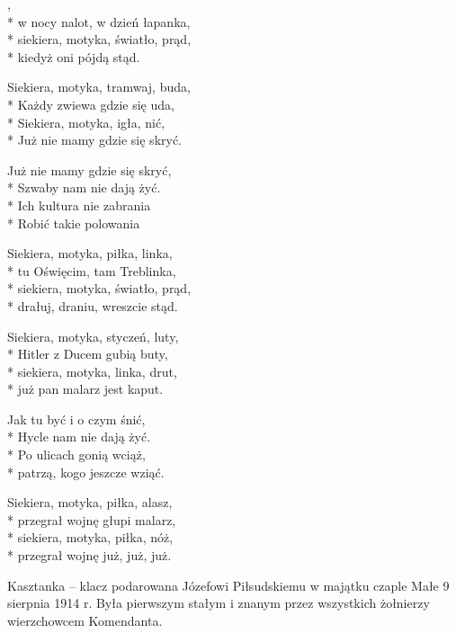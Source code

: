 \begin{lyrics}[longestline={Siekiera, motyka, bimber, szklanka,}]

,\\*
w nocy nalot, w dzień łapanka,\\*
siekiera, motyka, światło, prąd,\\*
kiedyż oni pójdą stąd.

Siekiera, motyka, tramwaj, buda,\\*
Każdy zwiewa gdzie się uda,\\*
Siekiera, motyka, igła, nić,\\*
Już nie mamy gdzie się skryć.

Już nie mamy gdzie się skryć,\\*
Szwaby nam nie dają żyć.\\*
Ich kultura nie zabrania\\*
Robić takie polowania

Siekiera, motyka, piłka, linka,\\*
tu Oświęcim, tam Treblinka,\\*
siekiera, motyka, światło, prąd,\\*
drałuj, draniu, wreszcie stąd.

Siekiera, motyka, styczeń, luty,\\*
Hitler z Ducem gubią buty,\\*
siekiera, motyka, linka, drut,\\*
już pan malarz jest kaput.

Jak tu być i o czym śnić,\\*
Hycle nam nie dają żyć.\\*
Po ulicach gonią wciąż,\\*
patrzą, kogo jeszcze wziąć.

Siekiera, motyka, piłka, alasz,\\*
przegrał wojnę głupi malarz,\\*
siekiera, motyka, piłka, nóż,\\*
przegrał wojnę już, już, już.
\end{lyrics}



\begin{info}Kasztanka – klacz podarowana Józefowi Piłsudskiemu w majątku czaple Małe 9 sierpnia 1914 r. Była pierwszym stałym i znanym przez wszystkich żołnierzy wierzchowcem Komendanta.\end{info}

